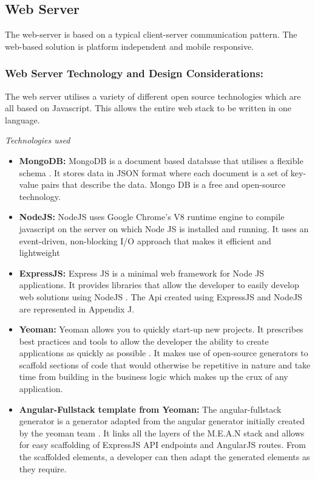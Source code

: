 \documentclass[12pt]{witseiepaper}
\begin{document}
\subsection{Web Server}
The web-server is based on a typical client-server communication pattern. The web-based solution is platform independent and mobile responsive.
\subsubsection{Web Server Technology and Design Considerations:} 
The web server utilises a variety of different open source technologies which are all based on Javascript. This allows the entire web stack to be written in one language.

\textit{Technologies used}
\begin{itemize}
  \item \textbf{MongoDB:} MongoDB is a document based database that utilises a flexible schema \cite{MongoDB}. It stores data in JSON format where each document is a set of key-value pairs that describe the data. Mongo DB is a free and open-source technology.
  \item \textbf{NodeJS:} NodeJS uses Google Chrome's V8 runtime engine to compile javascript on the server on which Node JS is installed and running. It uses an event-driven, non-blocking I/O approach that makes it efficient and lightweight \cite{NodeJS}
  \item \textbf{ExpressJS:} Express JS is a minimal web framework for Node JS applications. It provides libraries that allow the developer to easily develop web solutions using NodeJS \cite{ExpressJS}. The Api created using ExpressJS and NodeJS are represented in Appendix J.
  \item \textbf{Yeoman:} Yeoman allows you to quickly start-up new projects. It prescribes best practices and tools to allow the developer the ability to create applications as quickly as possible \cite{Yeoman}. It makes use of open-source generators to scaffold sections of code that would otherwise be repetitive in nature and take time from building in the business logic which makes up the crux of any application.
  \item \textbf{Angular-Fullstack template from Yeoman:} The angular-fullstack generator is a generator adapted from the angular generator initially created by the yeoman team \cite{AngularFullstack}. It links all the layers of the M.E.A.N stack and allows for easy scaffolding of ExpressJS API endpoints and AngularJS routes. From the scaffolded elements, a developer can then adapt the generated elements as they require.
\end{itemize}
\end{document}
